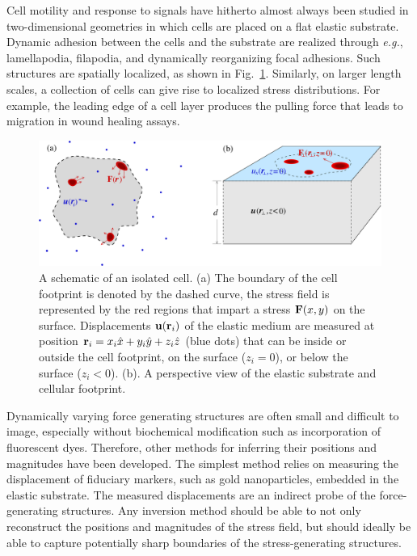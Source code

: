 \documentclass[aps,prl,reprint,twocolumn,groupedaddress,showpacs]{revtex4-1}
\def\r{{\bf r}}
\begin{document}
Cell motility and response to signals have hitherto almost always been
studied in two-dimensional geometries in which cells are placed on a
flat elastic substrate.  Dynamic adhesion between the cells and the
substrate are realized through {\it e.g.}, lamellapodia, filapodia,
and dynamically reorganizing focal adhesions.  Such structures are
spatially localized, as shown in Fig.~\ref{FIG1}. Similarly, on larger
length scales, a collection of cells can give rise to localized stress
distributions. For example, the leading edge of a cell layer produces
the pulling force that leads to migration in wound healing assays.

\begin{figure}[t]
\begin{center}
\includegraphics[width=\linewidth]{Fig1}
\caption{A schematic of an isolated cell. (a) The boundary of the cell
  footprint is denoted by the dashed curve, the stress field is
  represented by the red regions that impart a stress ${\bf F}(x,y)$
  on the surface. Displacements ${\bf u}(\r_{i})$ of the elastic
  medium are measured at position $\r_{i} =
  x_{i}\hat{x}+y_{i}\hat{y}+z_{i}\hat{z}$ (blue dots) that can be
  inside or outside the cell footprint, on the surface ($z_{i}=0$), or
  below the surface ($z_{i}<0$). (b). A perspective view of the
  elastic substrate and cellular footprint.}
\label{FIG1}
\end{center}
\end{figure}


Dynamically varying force generating structures are often small and
difficult to image, especially without biochemical modification such
as incorporation of fluorescent dyes. Therefore, other methods for
inferring their positions and magnitudes have been developed. The
simplest method relies on measuring the displacement of fiduciary
markers, such as gold nanoparticles, embedded in the elastic
substrate. The measured displacements are an indirect probe of the
force-generating structures.  Any inversion method should be able to
not only reconstruct the positions and magnitudes of the stress field,
but should ideally be able to capture potentially sharp boundaries of
the stress-generating structures.
\end{document}
